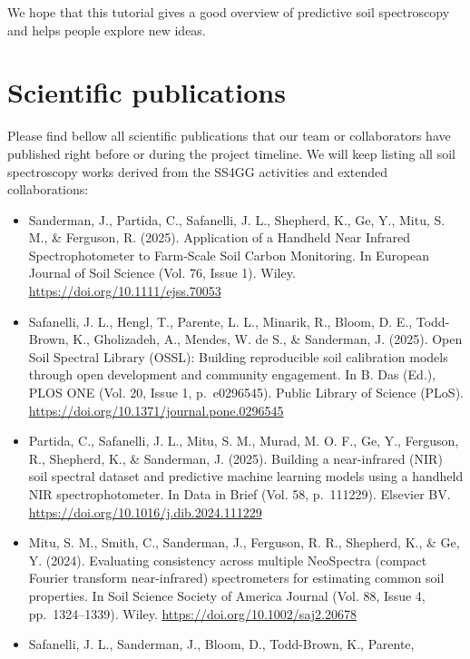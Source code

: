 \documentclass[
  letterpaper,
  DIV=11,
  numbers=noendperiod]{scrreprt}
\begin{document}
We hope that this tutorial gives a good overview of predictive soil
spectroscopy and helps people explore new ideas.


\chapter{Scientific publications}\label{sec-publications}

Please find bellow all scientific publications that our team or
collaborators have published right before or during the project
timeline. We will keep listing all soil spectroscopy works derived from
the SS4GG activities and extended collaborations:

\begin{itemize}
\item
  Sanderman, J., Partida, C., Safanelli, J. L., Shepherd, K., Ge, Y.,
  Mitu, S. M., \& Ferguson, R. (2025). Application of a Handheld Near
  Infrared Spectrophotometer to Farm‐Scale Soil Carbon Monitoring. In
  European Journal of Soil Science (Vol. 76, Issue 1). Wiley.
  \url{https://doi.org/10.1111/ejss.70053}
\item
  Safanelli, J. L., Hengl, T., Parente, L. L., Minarik, R., Bloom, D.
  E., Todd-Brown, K., Gholizadeh, A., Mendes, W. de S., \& Sanderman, J.
  (2025). Open Soil Spectral Library (OSSL): Building reproducible soil
  calibration models through open development and community engagement.
  In B. Das (Ed.), PLOS ONE (Vol. 20, Issue 1, p.~e0296545). Public
  Library of Science (PLoS).
  \url{https://doi.org/10.1371/journal.pone.0296545}
\item
  Partida, C., Safanelli, J. L., Mitu, S. M., Murad, M. O. F., Ge, Y.,
  Ferguson, R., Shepherd, K., \& Sanderman, J. (2025). Building a
  near-infrared (NIR) soil spectral dataset and predictive machine
  learning models using a handheld NIR spectrophotometer. In Data in
  Brief (Vol. 58, p.~111229). Elsevier BV.
  \url{https://doi.org/10.1016/j.dib.2024.111229}
\item
  Mitu, S. M., Smith, C., Sanderman, J., Ferguson, R. R., Shepherd, K.,
  \& Ge, Y. (2024). Evaluating consistency across multiple NeoSpectra
  (compact Fourier transform near‐infrared) spectrometers for estimating
  common soil properties. In Soil Science Society of America Journal
  (Vol. 88, Issue 4, pp.~1324--1339). Wiley.
  \url{https://doi.org/10.1002/saj2.20678}
\item
  Safanelli, J. L., Sanderman, J., Bloom, D., Todd-Brown, K., Parente,

\end{itemize}
\end{document}
